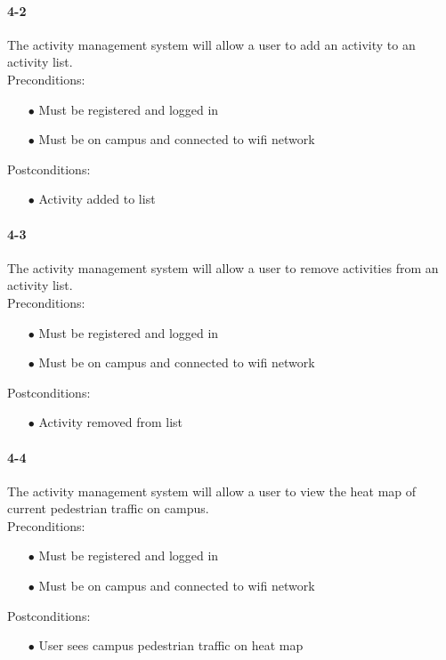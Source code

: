 \documentclass[a4paper,12pt]{article}
\begin{document}
\paragraph{4-2}
The activity management system will allow a user to add an activity to an activity list.\\
Preconditions:
\begin{itemize}
	\item[$\bullet$] Must be registered and logged in
	\item[$\bullet$] Must be on campus and connected to wifi network
\end{itemize}
Postconditions:
\begin{itemize}
	\item[$\bullet$] Activity added to list
\end{itemize}
\paragraph{4-3}
The activity management system will allow a user to remove activities from an activity list.\\
Preconditions:
\begin{itemize}
	\item[$\bullet$] Must be registered and logged in
	\item[$\bullet$] Must be on campus and connected to wifi network
\end{itemize}
Postconditions:
\begin{itemize}
	\item[$\bullet$] Activity removed from list
\end{itemize}
\paragraph{4-4}
The activity management system will allow a user to view the heat map of current pedestrian traffic on campus.\\
Preconditions:
\begin{itemize}
	\item[$\bullet$] Must be registered and logged in
	\item[$\bullet$] Must be on campus and connected to wifi network
\end{itemize}
Postconditions:
\begin{itemize}
	\item[$\bullet$] User sees campus pedestrian traffic on heat map
\end{itemize}
\end{document}
